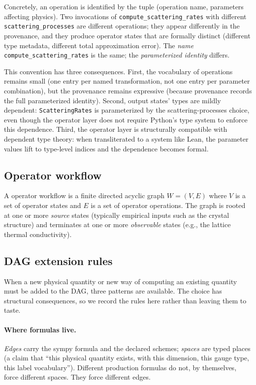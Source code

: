 \documentclass[11pt,a4paper]{article}
\begin{document}
Concretely, an operation is identified by the tuple (operation name, parameters affecting
physics). Two invocations of \texttt{compute\_scattering\_rates} with different
\texttt{scattering\_processes} are different operations; they appear differently in the
provenance, and they produce operator states that are formally distinct (different type metadata,
different total approximation error). The \emph{name} \texttt{compute\_scattering\_rates} is the
same; the \emph{parameterized identity} differs.

This convention has three consequences. First, the vocabulary of operations remains small (one
entry per named transformation, not one entry per parameter combination), but the provenance
remains expressive (because provenance records the full parameterized identity). Second, output
states' types are mildly dependent: \texttt{ScatteringRates} is parameterized by the
scattering-processes choice, even though the operator layer does not require Python's type system to
enforce this dependence. Third, the operator layer is structurally compatible with dependent type
theory: when transliterated to a system like Lean, the parameter values lift to type-level
indices and the dependence becomes formal.


\subsection{Operator workflow}

A operator workflow is a finite directed acyclic graph $W = (V, E)$ where $V$ is a set of
operator states and $E$ is a set of operator operations. The graph is rooted at one or more
\emph{source} states (typically empirical inputs such as the crystal structure) and terminates
at one or more \emph{observable} states (e.g., the lattice thermal conductivity).

\subsection{DAG extension rules}
\label{ssec:dag-extension-rules}

When a new physical quantity or new way of computing an existing quantity must be
added to the DAG, three patterns are available. The choice has structural
consequences, so we record the rules here rather than leaving them to taste.

\paragraph{Where formulas live.} \emph{Edges} carry the sympy formula and the
declared schemes; \emph{spaces} are typed places (a claim that ``this physical
quantity exists, with this dimension, this gauge type, this label
vocabulary''). Different production formulas do not, by themselves, force
different spaces. They force different edges.
\end{document}
